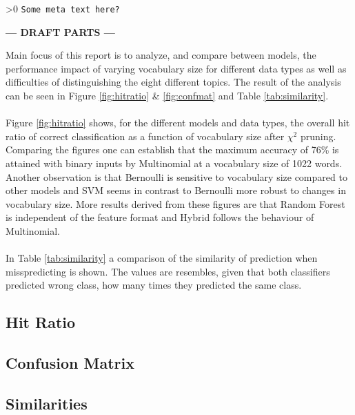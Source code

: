 \ifnum\printdraft>0
	\texttt{Some meta text here?}
\else
\begin{center}
	\textbf{--- DRAFT PARTS ---}
\end{center}
\fi

Main focus of this report is to analyze, and compare between models, the performance impact of varying vocabulary size for different data types as well as difficulties of distinguishing the eight different topics. The result of the analysis can be seen in Figure \ref{fig:hitratio} \& \ref{fig:confmat} and Table \ref{tab:similarity}.\\\\
Figure \ref{fig:hitratio} shows, for the different models and data types, the overall hit ratio of correct classification as a function of vocabulary size after $\chi^2$ pruning. Comparing the figures one can establish that the maximum accuracy of 76\% is attained with binary inputs by Multinomial at a vocabulary size of 1022 words. Another observation is that Bernoulli is sensitive to vocabulary size compared to other models and SVM seems in contrast to Bernoulli more robust to changes in vocabulary size. More results derived from these figures are that Random Forest is independent of the feature format and Hybrid follows the behaviour of Multinomial.\\\\


In Table \ref{tab:similarity} a comparison of the similarity of prediction when misspredicting is shown. The values are resembles, given that both classifiers predicted wrong class, how many times they predicted the same class.

\onecolumn
\subsection{Hit Ratio}

\onecolumn
\subsection{Confusion Matrix}

\twocolumn
\subsection{Similarities}
